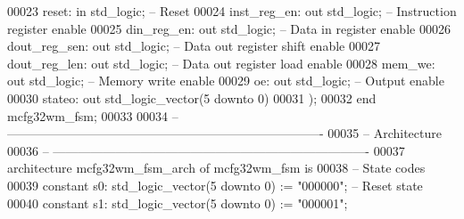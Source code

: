 \begin{DoxyCode}
00023         \textcolor{vhdlchar}{reset}\textcolor{vhdlchar}{:} \textcolor{keywordflow}{in} \textcolor{comment}{std\_logic};\textcolor{keyword}{                -- Reset}
00024         inst\_reg\_en: \textcolor{keywordflow}{out} \textcolor{comment}{std\_logic};         -- Instruction \textcolor{keywordflow}{register} enable
00025         \textcolor{vhdlchar}{din_reg_en}\textcolor{vhdlchar}{:} \textcolor{keywordflow}{out} \textcolor{comment}{std\_logic};\textcolor{keyword}{          -- Data in register enable}
00026         \textcolor{vhdlchar}{dout_reg_sen}\textcolor{vhdlchar}{:} \textcolor{keywordflow}{out} \textcolor{comment}{std\_logic};\textcolor{keyword}{            -- Data out register shift enable}
00027         \textcolor{vhdlchar}{dout_reg_len}\textcolor{vhdlchar}{:} \textcolor{keywordflow}{out} \textcolor{comment}{std\_logic};\textcolor{keyword}{            -- Data out register load enable}
00028         \textcolor{vhdlchar}{mem_we}\textcolor{vhdlchar}{:} \textcolor{keywordflow}{out} \textcolor{comment}{std\_logic};\textcolor{keyword}{              -- Memory write enable}
00029         \textcolor{vhdlchar}{oe}\textcolor{vhdlchar}{:} \textcolor{keywordflow}{out} \textcolor{comment}{std\_logic};\textcolor{keyword}{              -- Output enable}
00030         \textcolor{vhdlchar}{stateo}\textcolor{vhdlchar}{:} \textcolor{keywordflow}{out} \textcolor{comment}{std\_logic\_vector}\textcolor{vhdlchar}{(}\textcolor{vhdllogic}{}\textcolor{vhdllogic}{5} \textcolor{keywordflow}{downto} \textcolor{vhdllogic}{}\textcolor{vhdllogic}{0}\textcolor{vhdlchar}{)}
00031     \textcolor{vhdlchar}{)};
00032 \textcolor{keywordflow}{end} \textcolor{vhdlchar}{mcfg32wm\_fsm};
00033 
00034 \textcolor{keyword}{-- ----------------------------------------------------------------------------}
00035 \textcolor{keyword}{-- Architecture}
00036 \textcolor{keyword}{-- ----------------------------------------------------------------------------}
00037 \textcolor{keywordflow}{architecture} mcfg32wm\_fsm\_arch \textcolor{keywordflow}{of} mcfg32wm_fsm is
00038 \textcolor{keyword}{    -- State codes}
00039     \textcolor{keywordflow}{constant} \textcolor{vhdlchar}{s0}\textcolor{vhdlchar}{:}  \textcolor{comment}{std\_logic\_vector}\textcolor{vhdlchar}{(}\textcolor{vhdllogic}{}\textcolor{vhdllogic}{5} \textcolor{keywordflow}{downto} \textcolor{vhdllogic}{}\textcolor{vhdllogic}{0}\textcolor{vhdlchar}{)} \textcolor{vhdlchar}{:=} \textcolor{vhdllogic}{"000000"};\textcolor{keyword}{ -- Reset state}
00040     \textcolor{keywordflow}{constant} \textcolor{vhdlchar}{s1}\textcolor{vhdlchar}{:}  \textcolor{comment}{std\_logic\_vector}\textcolor{vhdlchar}{(}\textcolor{vhdllogic}{}\textcolor{vhdllogic}{5} \textcolor{keywordflow}{downto} \textcolor{vhdllogic}{}\textcolor{vhdllogic}{0}\textcolor{vhdlchar}{)} \textcolor{vhdlchar}{:=} \textcolor{vhdllogic}{"000001"};

\end{DoxyCode}
